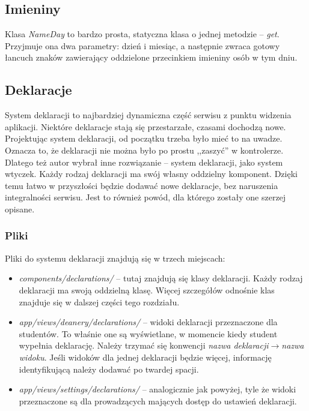 \documentclass[a4paper,12pt,oneside]{report}
\begin{document}
\subsection{Imieniny}
\label{sub:nameday}
Klasa \emph{NameDay} to bardzo prosta, statyczna klasa o jednej metodzie -- \emph{get}. Przyjmuje ona dwa parametry: dzień i miesiąc, a następnie zwraca gotowy łancuch znaków zawierający oddzielone przecinkiem imieniny osób w tym dniu.

\subsection{Deklaracje}
\label{sub:deklaracje}
System deklaracji to najbardziej dynamiczna część serwisu z punktu widzenia aplikacji. Niektóre deklaracje stają się przestarzałe, czasami dochodzą nowe. Projektując system deklaracji, od początku trzeba było mieć to na uwadze. Oznacza to, że deklaracji nie można było po prostu ,,zaszyć'' w kontrolerze. Dlatego też autor wybrał inne rozwiązanie -- system deklaracji, jako system wtyczek. Każdy rodzaj deklaracji ma swój własny oddzielny komponent. Dzięki temu łatwo w przyszłości będzie dodawać nowe deklaracje, bez naruszenia integralności serwisu. Jest to również powód, dla którego zostały one szerzej opisane.

\subsubsection{Pliki}
\label{subsub:dec-files}
Pliki do systemu deklaracji znajdują się w trzech miejscach:
\begin{itemize}
  \item \emph{components/declarations/} -- tutaj znajdują się klasy deklaracji. Każdy rodzaj deklaracji ma swoją oddzielną klasę. Więcej szczegółów odnośnie klas znajduje się w dalszej części tego rozdziału.
  \item \emph{app/views/deanery/declarations/} -- widoki deklaracji przeznaczone dla studentów. To właśnie one są wyświetlane, w momencie kiedy student wypełnia deklarację. Należy trzymać się konwencji \emph{nazwa deklaracji}$\to$\emph{nazwa widoku}. Jeśli widoków dla jednej deklaracji będzie więcej, informację identyfikującą należy dodawać po twardej spacji.
  \item \emph{app/views/settings/declarations/} -- analogicznie jak powyżej, tyle że widoki przeznaczone są dla prowadzących mających dostęp do ustawień deklaracji.
\end{itemize}
\end{document}
